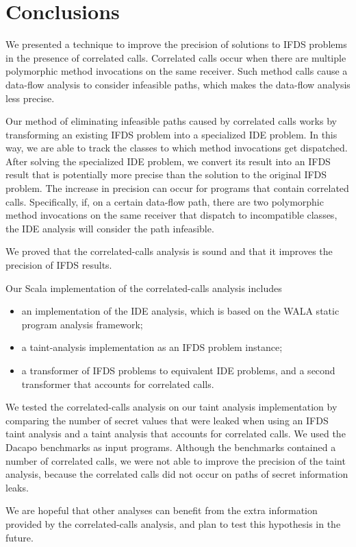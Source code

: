 \section{Conclusions}\label{chapter:concl}
We presented a technique to improve the precision of solutions to IFDS problems in the presence of correlated calls. Correlated calls occur when there are multiple polymorphic method invocations on the same receiver. Such method calls cause a data-flow analysis to consider infeasible paths, which makes the data-flow analysis less precise.

Our method of eliminating infeasible paths caused by correlated calls works by transforming an existing IFDS problem into a specialized IDE problem. In this way, we are able to track the classes to which method invocations get dispatched. After solving the specialized IDE problem, we convert its result into an IFDS result that is potentially more precise than the solution to the original IFDS problem. The increase in precision can occur for programs that contain correlated calls. Specifically, if, on a certain data-flow path, there are two polymorphic method invocations on the same receiver that dispatch to incompatible classes, the IDE analysis will consider the path infeasible.

We proved that the correlated-calls analysis is sound and that it improves the precision of IFDS results.

Our Scala implementation of the correlated-calls analysis includes
\begin{itemize}
  \item an implementation of the IDE analysis, which is based on the WALA static program analysis framework;
  \item a taint-analysis implementation as an IFDS problem instance;
  \item a transformer of IFDS problems to equivalent IDE problems, and a second transformer that accounts for correlated calls.
\end{itemize}

We tested the correlated-calls analysis on our taint analysis implementation by comparing the number of secret values that were leaked when using an IFDS taint analysis and a taint analysis that accounts for correlated calls. We used the Dacapo benchmarks as input programs. Although the benchmarks contained a number of correlated calls, we were not able to improve the precision of the taint analysis, because the correlated calls did not occur on paths of secret information leaks.

We are hopeful that other analyses can benefit from the extra information provided by the correlated-calls analysis, and plan to test this hypothesis in the future.
